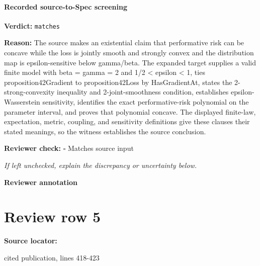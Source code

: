 \documentclass[10pt]{article}
\newcommand{\reviewerbox}{%
  \par\noindent\fbox{\parbox{0.96\linewidth}{\rule{0pt}{0.38in}}}\par
}
\newcommand{\reviewmatch}[1]{%
  \par\noindent\textbf{Reviewer check:} $\square$\; #1\par
  \noindent\emph{If left unchecked, explain the discrepancy or uncertainty below.}\par
}
\begin{document}
\paragraph{Recorded source-to-Spec screening}
\textbf{Verdict:} \texttt{matches}
\\
{\raggedright
\textbf{Reason:} The source makes an existential claim that performative risk can be concave while the loss is jointly smooth and strongly convex and the distribution map is epsilon-\allowbreak{}sensitive below gamma/\allowbreak{}beta.\allowbreak{} The expanded target supplies a valid finite model with beta = gamma = 2 and 1/\allowbreak{}2 < epsilon < 1, ties proposition42Gradient to proposition42Loss by HasGradientAt, states the 2-\allowbreak{}strong-\allowbreak{}convexity inequality and 2-\allowbreak{}joint-\allowbreak{}smoothness condition, establishes epsilon-\allowbreak{}Wasserstein sensitivity, identifies the exact performative-\allowbreak{}risk polynomial on the parameter interval, and proves that polynomial concave.\allowbreak{} The displayed finite-\allowbreak{}law, expectation, metric, coupling, and sensitivity definitions give these clauses their stated meanings, so the witness establishes the source conclusion.\allowbreak{}
\par}
\reviewmatch{Matches source input}
\noindent\textbf{Reviewer annotation}\par
\reviewerbox
\clearpage
\hypertarget{source-claim-cef541336c7da1ef}{}
\section*{Review row 5}
\textbf{Source locator:} {\footnotesize\raggedright cited publication, lines 418-\allowbreak{}423\par}
\end{document}
